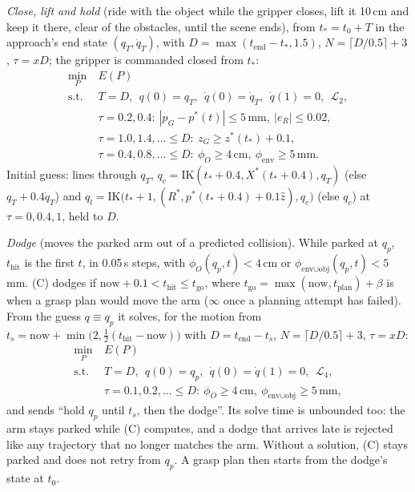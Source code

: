 \documentclass[conference]{IEEEtran}
\begin{document}
\emph{Close, lift and hold} (ride with the object while the gripper closes, lift it 10\,cm and keep it there, clear of
the obstacles, until the scene ends), from $t_*=t_0+T$ in the approach's end state $(q_T,\dot q_T)$, with
$D=\max(t_{\text{end}}-t_*,1.5)$, $N=\lceil D/0.5\rceil+3$, $\tau=xD$; the gripper is commanded closed from $t_*$:
\begin{equation}
\begin{aligned}
\min_{P}\ & E(P)\\
\text{s.t.}\ & T=D,\ \ q(0)=q_T,\ \ \dot q(0)=\dot q_T,\ \ \dot q(1)=0,\ \ \mathcal L_2,\\
& \tau=0.2,0.4:\ |p_G-p^*(t)|\le5\,\text{mm},\ |e_R|\le0.02,\\
& \tau=1.0,1.4,\dots\le D:\ z_G\ge z^*(t_*)+0.1,\\
& \tau=0.4,0.8,\dots\le D:\ \phi_O\ge4\,\text{cm},\ \phi_{\text{env}}\ge5\,\text{mm}.
\end{aligned}
\label{eq:holdC}
\end{equation}
Initial guess: lines through $q_T$, $q_c=\mathrm{IK}(t_*+0.4,X^*(t_*+0.4),q_T)$ (else $q_T+0.4\dot q_T$) and
$q_l=\mathrm{IK}\big(t_*+1,(R^*,p^*(t_*+0.4)+0.1\hat z),q_c\big)$ (else $q_c$) at $\tau=0,0.4,1$, held to $D$.

\emph{Dodge} (moves the parked arm out of a predicted collision). While parked at $q_p$, $t_{\text{hit}}$ is the first
$t$, in 0.05\,s steps, with $\phi_O(q_p,t)<4$\,cm or $\phi_{\text{env}\cup\text{obj}}(q_p,t)<5$\,mm. (C) dodges if
$\text{now}+0.1<t_{\text{hit}}\le t_{\text{go}}$, where $t_{\text{go}}=\max(\text{now},t_{\text{plan}})+\beta$ is
when a grasp plan would move the arm ($\infty$ once a planning attempt has failed). From the guess $q\equiv q_p$ it
solves, for the motion from $t_s=\text{now}+\min\big(2,\tfrac12(t_{\text{hit}}-\text{now})\big)$ with
$D=t_{\text{end}}-t_s$, $N=\lceil D/0.5\rceil+3$, $\tau=xD$:
\begin{equation}
\begin{aligned}
\min_{P}\ & E(P)\\
\text{s.t.}\ & T=D,\ \ q(0)=q_p,\ \ \dot q(0)=\dot q(1)=0,\ \ \mathcal L_4,\\
& \tau=0.1,0.2,\dots\le D:\ \phi_O\ge4\,\text{cm},\ \phi_{\text{env}\cup\text{obj}}\ge5\,\text{mm},
\end{aligned}
\label{eq:dodgeC}
\end{equation}
and sends ``hold $q_p$ until $t_s$, then the dodge''. Its solve time is unbounded too: the arm stays parked while (C)
computes, and a dodge that arrives late is rejected like any trajectory that no longer matches the arm. Without a
solution, (C) stays parked and does not retry from $q_p$. A grasp plan then starts from the dodge's state at $t_0$.
\end{document}
